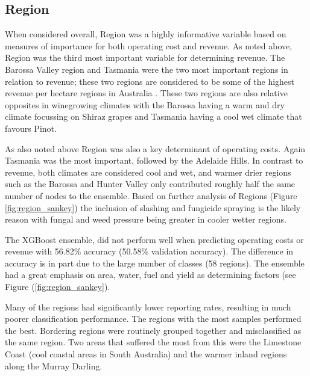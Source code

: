 \documentclass[review,12pt,authoryear]{elsarticle}
\begin{document}
\begin{linenumbers}
\subsection{Region}

 


When considered overall, Region was a highly informative variable based on measures of importance for both operating cost and revenue. As noted above, Region was the third most important variable for determining revenue. The Barossa Valley region and Tasmania were the two most important regions in relation to revenue; these two regions are considered to be some of the highest revenue per hectare regions in Australia \citep{wineaustraliaNationalVintageReport2022}. These two regions are also relative opposites in winegrowing climates with the Barossa having a warm and dry climate focussing on Shiraz grapes and Tasmania having a cool wet climate that favours Pinot. 
\par
As also noted above Region was also a key determinant of operating costs. Again Tasmania was the most important, followed by the Adelaide Hills. In contrast to revenue, both climates are considered cool and wet, and warmer drier regions such as the Barossa and Hunter Valley only contributed roughly half the same number of nodes to the ensemble. Based on further analysis of Regions (Figure \ref{fig:region_sankey}) the inclusion of slashing and fungicide spraying is the likely reason with fungal and weed pressure being greater in cooler wetter regions.
\par
The XGBoost ensemble, did not perform well when predicting operating costs or revenue with 56.82\% accuracy (50.58\% validation accuracy). The difference in accuracy is in part due to the large number of classes (58 regions). The ensemble had a great emphasis on area, water, fuel and yield as determining factors (see Figure (\ref{fig:region_sankey}). 
\par
Many of the regions had significantly lower reporting rates, resulting in much poorer classification performance. The regions with the most samples performed the best. Bordering regions were routinely grouped together and misclassified as the same region. Two areas that suffered the most from this were the Limestone Coast (cool coastal areas in South Australia) and the warmer inland regions along the Murray Darling.


\end{linenumbers}
\end{document}
